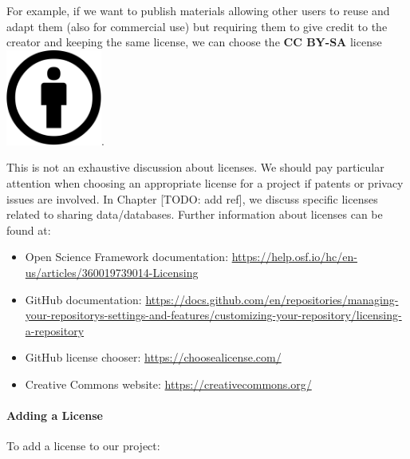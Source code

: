 \documentclass[
  11pt,
]{book}
\providecommand{\tightlist}{%
  \setlength{\itemsep}{0pt}\setlength{\parskip}{0pt}}
\begin{document}
For example, if we want to publish materials allowing other users to reuse and adapt them (also for commercial use) but requiring them to give credit to the creator and keeping the same license, we can choose the \textbf{CC BY-SA} license \includegraphics[width=8.5em,height=\textheight]{images/projects/by-credits.png}.

This is not an exhaustive discussion about licenses. We should pay particular attention when choosing an appropriate license for a project if patents or privacy issues are involved. In Chapter {[}TODO: add ref{]}, we discuss specific licenses related to sharing data/databases. Further information about licenses can be found at:

\begin{itemize}
\tightlist
\item
  Open Science Framework documentation: \url{https://help.osf.io/hc/en-us/articles/360019739014-Licensing}
\item
  GitHub documentation: \url{https://docs.github.com/en/repositories/managing-your-repositorys-settings-and-features/customizing-your-repository/licensing-a-repository}
\item
  GitHub license chooser: \url{https://choosealicense.com/}
\item
  Creative Commons website: \url{https://creativecommons.org/}
\end{itemize}

\hypertarget{adding-a-license}{%
\paragraph*{Adding a License}\label{adding-a-license}}

To add a license to our project:
\end{document}
